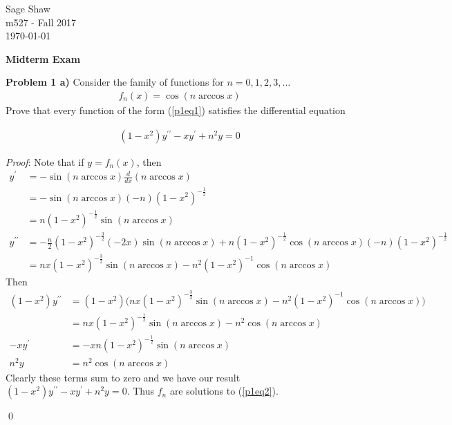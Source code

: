 \documentclass[12pt]{article}
\newcommand{\problem}[1]{\hspace{-4 ex} \large \textbf{Problem #1} }
\renewenvironment{proof}{\hspace{-4 ex} \emph{Proof}:}{\qed}
\begin{document}
	\thispagestyle{empty}
	
	\begin{flushright}
		Sage Shaw \\
		m527 - Fall 2017 \\
		\today
	\end{flushright}
	
{\large \textbf{Midterm Exam}}\bigbreak

\problem{1 a)} Consider the family of functions for $n = 0,1,2,3,\dots$
\begin{align} \label{p1eq1}
	f_n(x)=\cos{(n \arccos{x})}
\end{align}
Prove that every function of the form (\ref{p1eq1}) satisfies the differential equation
	
	\begin{align}\label{p1eq2}
		(1-x^2)y^{\prime\prime}-xy^\prime+n^2y=0
	\end{align}
	
	\begin{proof}
		Note that if $y = f_n(x)$, then
		\begin{align*}
			y^\prime & = -\sin{(n \arccos{x})} \tfrac{d}{dx}(n \arccos{x}) \\
			& = -\sin{(n \arccos{x})} (-n)(1-x^2)^{-\frac{1}{2}} \\
			& = n(1-x^2)^{-\frac{1}{2}}\sin{(n \arccos{x})}  \\
			y^{\prime\prime} &= -\tfrac{n}{2}(1-x^2)^{-\frac{3}{2}}(-2x)\sin{(n \arccos{x})} + n(1-x^2)^{-\frac{1}{2}}\cos{(n \arccos{x})}(-n)(1-x^2)^{-\frac{1}{2}} \\
			&= nx(1-x^2)^{-\frac{3}{2}}\sin{(n \arccos{x})} - n^2(1-x^2)^{-1}\cos{(n\arccos{x})}
		\end{align*}
		Then 
		\begin{align*}
			(1-x^2)y^{\prime\prime} & = (1-x^2) \Big( nx(1-x^2)^{-\frac{3}{2}}\sin{(n \arccos{x})} - n^2(1-x^2)^{-1}\cos{(n\arccos{x})} \Big) \\
			& = nx(1-x^2)^{-\frac{1}{2}}\sin{(n \arccos{x})} - n^2\cos{(n\arccos{x})} \\
			-xy^\prime & = -x n(1-x^2)^{-\frac{1}{2}}\sin{(n \arccos{x})} \\
			n^2y & = n^2\cos{(n \arccos{x})}
		\end{align*}
		Clearly these terms sum to zero and we have our result $(1-x^2)y^{\prime\prime}-xy^\prime+n^2y=0$. Thus $f_n$ are solutions to (\ref{p1eq2}).
		
	\end{proof}
	
\end{document}
